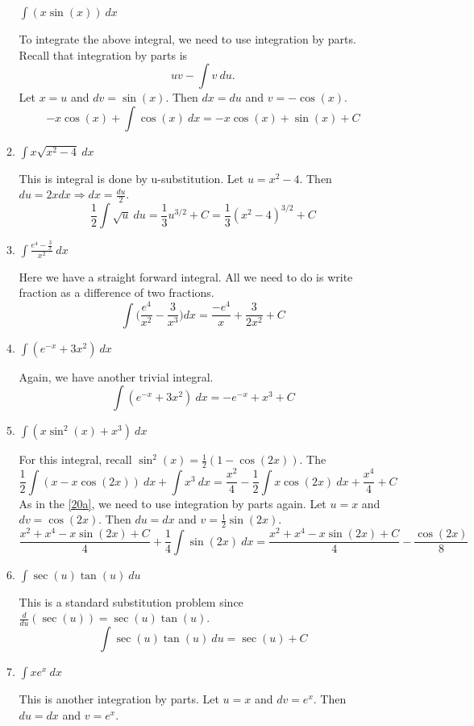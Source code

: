 \begin{enumerate}
\begin{enumerate}[label = (\alph*), ref = \theenumi{(\alph*)}]
    \(\int(x\sin(x)) \ dx\)
    \par\smallskip
    To integrate the above integral, we need to use integration by parts.
    Recall that integration by parts is
    \[
    uv - \int v \ du.
    \]
    Let \(x = u\) and \(dv = \sin(x)\).
    Then \(dx = du\) and \(v = -\cos(x)\).
    \[
    -x\cos(x) + \int\cos(x) \ dx = -x\cos(x) + \sin(x) + C
    \]
  \item
    \(\int x\sqrt{x^2 - 4} \ dx\)
    \par\smallskip
    This is integral is done by u-substitution.
    Let \(u = x^2 - 4\).
    Then \(du = 2xdx\Rightarrow dx = \frac{du}{2}\).
    \[
    \frac{1}{2}\int\sqrt{u} \ du = \frac{1}{3}u^{3/2} + C =
    \frac{1}{3}(x^2 - 4)^{3/2} + C
    \]
  \item
    \(\int\frac{e^4 - \frac{3}{x}}{x^2} \ dx\)
    \par\smallskip
    Here we have a straight forward integral.
    All we need to do is write fraction as a difference of two fractions.
    \[
    \int\bigg(\frac{e^4}{x^2} - \frac{3}{x^3}\bigg)dx =
    \frac{-e^4}{x} + \frac{3}{2x^2} + C
    \]
  \item
    \(\int(e^{-x} + 3x^2) \ dx\)
    \par\smallskip
    Again, we have another trivial integral.
    \[
    \int(e^{-x} + 3x^2) \ dx = -e^{-x} + x^3 + C
    \]
  \item
    \(\int(x\sin^2(x) + x^3) \ dx\)
    \par\smallskip
    For this integral, recall \(\sin^2(x) = \frac{1}{2}(1 - \cos(2x))\).
    The
    \[
    \frac{1}{2}\int(x - x\cos(2x)) \ dx + \int x^3 \ dx =
    \frac{x^2}{4} - \frac{1}{2}\int x\cos(2x) \ dx + \frac{x^4}{4} + C
    \]
    As in the \cref{20a}, we need to use integration by parts again.
    Let \(u = x\) and \(dv = \cos(2x)\).
    Then \(du = dx\) and \(v = \frac{1}{2}\sin(2x)\).
    \[
    \frac{x^2 + x^4 - x\sin(2x) + C}{4} + \frac{1}{4}\int\sin(2x) \ dx =
    \frac{x^2 + x^4 - x\sin(2x) + C}{4} - \frac{\cos(2x)}{8}
    \]
  \item
    \(\int\sec(u)\tan(u) \ du\)
    \par\smallskip
    This is a standard substitution problem since
    \(\frac{d}{du}(\sec(u)) = \sec(u)\tan(u)\).
    \[
    \int\sec(u)\tan(u) \ du = \sec(u) + C
    \]
  \item
    \(\int xe^x \ dx\)
    \par\smallskip
    This is another integration by parts.
    Let \(u = x\) and \(dv = e^x\).
    Then \(du = dx\) and \(v = e^x\).

\end{enumerate}
\end{enumerate}
